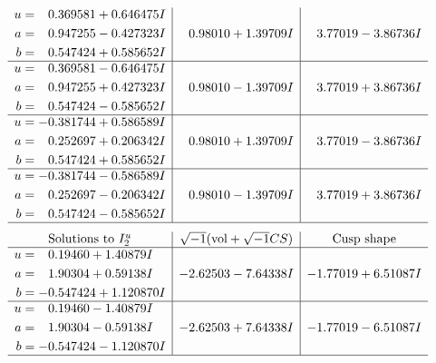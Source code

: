 \documentclass[1p]{elsarticle_modified}
\theoremstyle{definition}
\newcommand{\I}{\sqrt{-1}}
\begin{document}
$$\begin{array}{c|c|c}
\begin{aligned}
u &= \phantom{-}0.369581 + 0.646475 I \\
a &= \phantom{-}0.947255 - 0.427323 I \\
b &= \phantom{-}0.547424 + 0.585652 I\end{aligned}
 & \phantom{-}0.98010 + 1.39709 I & \phantom{-}3.77019 - 3.86736 I \\ \hline\begin{aligned}
u &= \phantom{-}0.369581 - 0.646475 I \\
a &= \phantom{-}0.947255 + 0.427323 I \\
b &= \phantom{-}0.547424 - 0.585652 I\end{aligned}
 & \phantom{-}0.98010 - 1.39709 I & \phantom{-}3.77019 + 3.86736 I \\ \hline\begin{aligned}
u &= -0.381744 + 0.586589 I \\
a &= \phantom{-}0.252697 + 0.206342 I \\
b &= \phantom{-}0.547424 + 0.585652 I\end{aligned}
 & \phantom{-}0.98010 + 1.39709 I & \phantom{-}3.77019 - 3.86736 I \\ \hline\begin{aligned}
u &= -0.381744 - 0.586589 I \\
a &= \phantom{-}0.252697 - 0.206342 I \\
b &= \phantom{-}0.547424 - 0.585652 I\end{aligned}
 & \phantom{-}0.98010 - 1.39709 I & \phantom{-}3.77019 + 3.86736 I\\
 \hline 
 \end{array}$$\newpage$$\begin{array}{c|c|c}  
\text{Solutions to }I^u_{2}& \I (\text{vol} + \sqrt{-1}CS) & \text{Cusp shape}\\
 \hline 
\begin{aligned}
u &= \phantom{-}0.19460 + 1.40879 I \\
a &= \phantom{-}1.90304 + 0.59138 I \\
b &= -0.547424 + 1.120870 I\end{aligned}
 & -2.62503 - 7.64338 I & -1.77019 + 6.51087 I \\ \hline\begin{aligned}
u &= \phantom{-}0.19460 - 1.40879 I \\
a &= \phantom{-}1.90304 - 0.59138 I \\
b &= -0.547424 - 1.120870 I\end{aligned}
 & -2.62503 + 7.64338 I & -1.77019 - 6.51087 I\\
 \hline 
 \end{array}$$\newpage\newpage\renewcommand{\arraystretch}{1}
\end{document}
